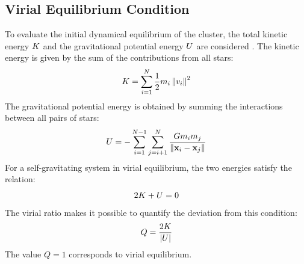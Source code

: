 \subsection{Virial Equilibrium Condition}
\label{subsec:equilibrio-viriale}
To evaluate the initial dynamical equilibrium of the cluster, the total kinetic energy $K$ and the gravitational potential energy $U$ are considered \cite{ciotti2021}. The kinetic energy is given by the sum of the contributions from all stars:
\begin{equation}
	K = \sum_{i=1}^{N}\frac{1}{2}m_i\left\|v_i\right\|^2
	\label{eq:kinetic-energy}
\end{equation}
The gravitational potential energy is obtained by summing the interactions between all pairs of stars:
\begin{equation}
	U = -\sum_{i=1}^{N-1}\sum_{j=i+1}^{N}
	\frac{G m_i m_j}{\left\|\mathbf{x}_i-\mathbf{x}_j\right\|}
	\label{eq:gravitational-potential-energy}
\end{equation}
For a self-gravitating system in virial equilibrium, the two energies satisfy the relation:
\begin{equation}
	2K+U=0
	\label{eq:virial-theorem}
\end{equation}
The virial ratio makes it possible to quantify the deviation from this condition:
\begin{equation}
	Q=\frac{2K}{|U|}
	\label{eq:virial-ratio}
\end{equation}
The value $Q=1$ corresponds to virial equilibrium.
